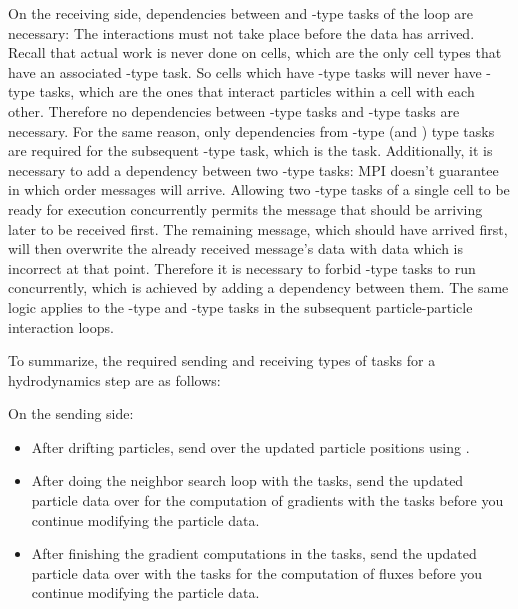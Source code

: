 On the receiving side, dependencies between  and -type tasks of the
 loop are necessary: The interactions must not take place before the data has
arrived. Recall that actual work is never done on  cells, which are the only cell
types that have an associated -type task. So cells which have -type
tasks will never have -type tasks, which are the ones that interact particles within a
cell with each other. Therefore no dependencies between -type tasks and
-type tasks are necessary. For the same reason, only dependencies from -type
(and ) type tasks are required for the subsequent -type task, which
is the  task. Additionally, it is necessary to add a dependency between two
-type tasks: MPI doesn't guarantee in which order messages will arrive. Allowing two
-type tasks of a single  cell to be ready for execution concurrently
permits the message that should be arriving later to be received first. The remaining message, which
should have arrived first, will then overwrite the already received message's data with data which
is incorrect at that point. Therefore it is necessary to forbid -type tasks to run
concurrently, which is achieved by adding a dependency between them. The same logic applies to the
-type and -type tasks in the subsequent particle-particle interaction
loops.

To summarize, the required sending and receiving types of tasks for a hydrodynamics step are as
follows:

On the sending side:

\begin{itemize}
 \item After drifting particles, send over the updated particle positions using .
 \item After doing the neighbor search loop with the  tasks, send the updated
particle data over for the computation of gradients with the  tasks before you
continue modifying the particle data.
 \item After finishing the gradient computations in the  tasks, send the updated
particle data over with the  tasks for the computation of fluxes before you
continue modifying the particle data.
\end{itemize}

